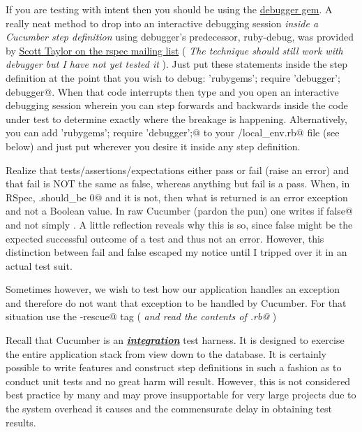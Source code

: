 If you are testing with intent then you should be using the \href{http://rubygems.org/gems/debugger/}{debugger gem}.  A really neat method to drop into an interactive debugging session \emph{inside a Cucumber step definition} using debugger's predecessor, ruby-debug, was provided by \href{http://www.ruby-forum.com/topic/175732#769713}{Scott Taylor on the rspec mailing list} ( \emph{The technique should still work with debugger but I have not yet tested it} ).  Just put these statements inside the step definition at the point that you wish to debug:  \verb@require 'rubygems'; require 'debugger'; debugger@.  When that code interrupts then type \verb@irb@ and you open an interactive debugging session wherein you can step forwards and backwards inside the code under test to determine exactly where the breakage is happening.  Alternatively, you can add \verb@require 'rubygems'; require 'debugger';@ to your \verb@support/local_env.rb@ file (see below) and just put \verb@debugger@ wherever you desire it inside any step definition.

Realize that tests/assertions/expectations either pass or fail (raise an error) and that fail is NOT the same as false, whereas anything but fail is a pass.  When, in RSpec, \verb@something.should_be 0@ and it is not, then what is returned is an error exception and not a Boolean value.  In raw Cucumber (pardon the pun) one writes \verb@fail if false@ and not simply \verb@false@.  A little reflection reveals why this is so, since false might be the expected successful outcome of a test and thus not an error.  However, this distinction between fail and false escaped my notice until I tripped over it in an actual test suit.

Sometimes however, we wish to test how our application handles an exception and therefore do not want that exception to be handled by Cucumber.  For that situation use the \verb@@allow-rescue@ tag ( \emph{and read the contents of \verb@env.rb@} )

Recall that Cucumber is an \textbf{\emph{\href{http://en.wikipedia.org/wiki/Integration_testing}{integration}}} test harness.  It is designed to exercise the entire application stack from view down to the database.  It is certainly possible to write features and construct step definitions in such a fashion as to conduct unit tests and no great harm will result.  However, this is not considered best practice by many and may prove insupportable for very large projects due to the system overhead it causes and the commensurate delay in obtaining test results.

